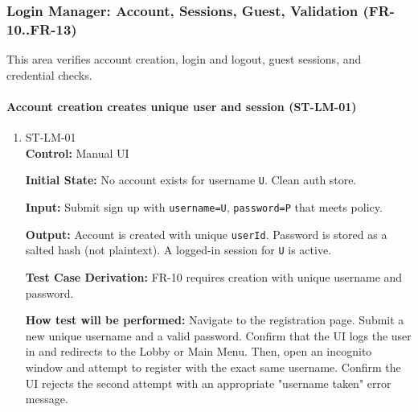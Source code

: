 \documentclass[12pt, titlepage]{article}
\begin{document}
\subsubsection{Login Manager: Account, Sessions, Guest, Validation (FR-10..FR-13)}

This area verifies account creation, login and logout, guest sessions, and credential checks.

\paragraph{Account creation creates unique user and session (ST-LM-01)}
\begin{enumerate}
\item{ST-LM-01\\}
\textbf{Control:} Manual UI

\textbf{Initial State:} No account exists for username \texttt{U}. Clean auth store.

\textbf{Input:} Submit sign up with \texttt{username=U}, \texttt{password=P} that meets policy.

\textbf{Output:} Account is created with unique \texttt{userId}. Password is stored as a salted hash (not plaintext). A logged-in session for \texttt{U} is active.

\textbf{Test Case Derivation:} FR-10 requires creation with unique username and password.

\textbf{How test will be performed:} Navigate to the registration page. Submit a new unique username and a valid password. Confirm that the UI logs the user in and redirects to the Lobby or Main Menu. Then, open an incognito window and attempt to register with the exact same username. Confirm the UI rejects the second attempt with an appropriate "username taken" error message.
\end{enumerate}
\end{document}
